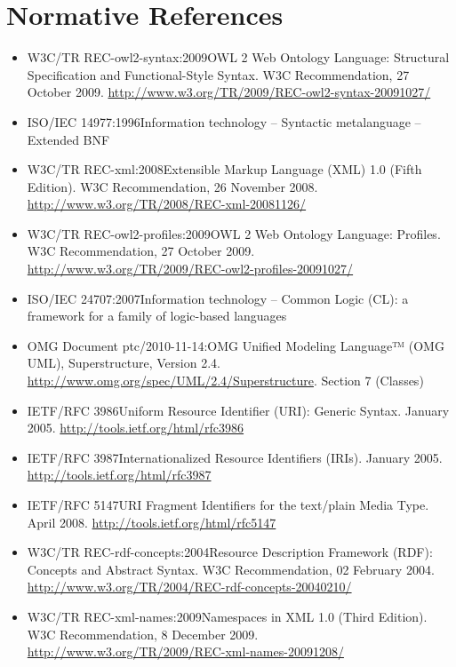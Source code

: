\documentclass[10pt,%
\ifpretendfinal
final%
\else
draft%
\fi,
]{scrreprt}
\begin{document}
\chapter{Normative References}
\begin{itemize}
  \item{W3C/TR REC-owl2-syntax:2009}{OWL 2 Web Ontology Language: Structural Specification and Functional-Style Syntax. W3C Recommendation, 27 October 2009. \url{http://www.w3.org/TR/2009/REC-owl2-syntax-20091027/}}
  \item{ISO/IEC 14977:1996}{Information technology – Syntactic metalanguage – Extended BNF}
  \item{W3C/TR REC-xml:2008}{Extensible Markup Language (XML) 1.0 (Fifth Edition). W3C Recommendation, 26 November 2008. \url{http://www.w3.org/TR/2008/REC-xml-20081126/}}
  \item{W3C/TR REC-owl2-profiles:2009}{OWL 2 Web Ontology Language: Profiles. W3C Recommendation, 27 October 2009. \url{http://www.w3.org/TR/2009/REC-owl2-profiles-20091027/}}
  \item{ISO/IEC 24707:2007}{Information technology – Common Logic (CL): a framework for a family of logic-based languages}
  \item{OMG Document ptc/2010-11-14:}{OMG Unified Modeling Language™ (OMG UML), Superstructure, Version 2.4. \url{http://www.omg.org/spec/UML/2.4/Superstructure}. Section 7 (Classes)}
  \item{IETF/RFC 3986}{Uniform Resource Identifier (URI): Generic Syntax. January 2005. \url{http://tools.ietf.org/html/rfc3986}}
  \item{IETF/RFC 3987}{Internationalized Resource Identifiers (IRIs). January 2005. \url{http://tools.ietf.org/html/rfc3987}}
  \item{IETF/RFC 5147}{URI Fragment Identifiers for the text/plain Media Type.  April 2008. \url{http://tools.ietf.org/html/rfc5147}}
  \item{W3C/TR REC-rdf-concepts:2004}{Resource Description Framework (RDF): Concepts and Abstract Syntax.  W3C Recommendation, 02 February 2004.  \url{http://www.w3.org/TR/2004/REC-rdf-concepts-20040210/}}
  \item{W3C/TR REC-xml-names:2009}{Namespaces in XML 1.0 (Third Edition). W3C Recommendation, 8 December 2009. \url{http://www.w3.org/TR/2009/REC-xml-names-20091208/}}

\end{itemize}
\end{document}
